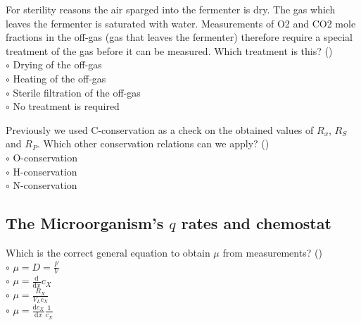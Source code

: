 \documentclass[]{beamer}
\begin{document}
\begin{frame}[shrink] {}
\addtocounter{questions}{1}
\color{blue} For sterility reasons the air sparged into the fermenter is dry. The gas which leaves the fermenter is saturated with water. Measurements of O2 and CO2 mole fractions in the off-gas (gas that leaves the fermenter) therefore require a special treatment of the gas before it can be measured. Which treatment is this?  ()\\
\color{black}
\setlength{\parindent}{-0.4cm}
{\color{red}$\circ$}     Drying of the off-gas \\
{\color{red}$\circ$} Heating of the off-gas \\
{\color{red}$\circ$} Sterile filtration of the off-gas\\
{\color{red}$\circ$} No treatment is required  
\end{frame}

\begin{frame}[shrink] {}
\addtocounter{questions}{1}
\color{blue}
Previously we used C-conservation as a check on the obtained values of $R_x$, $R_S$ and $R_P$.  Which other conservation relations can we apply?  ()\\
\color{black}
\setlength{\parindent}{-0.4cm}
{\color{red}$\circ$}     O-conservation \\
{\color{red}$\circ$} H-conservation\\
{\color{red}$\circ$} N-conservation  \\
\end{frame}
\subsection{The Microorganism's $q$ rates and chemostat} 
\setcounter{questions}{0}

\begin{frame}[shrink] {}
\addtocounter{questions}{1}
\color{blue}
 Which is the correct general equation to obtain $\mu$ from measurements? ()\\
\color{black}
\setlength{\parindent}{-0.4cm}
{\color{red}$\circ$} $\mu= D = \frac{F}{V}$ \\ 
{\color{red}$\circ$} $\mu = \frac{\mathrm d}{\mathrm d x}c_X$\\
{\color{red}$\circ$} $\mu = \frac{R_X}{V_{L}c_X}$ \\
{\color{red}$\circ$} $\mu = \frac{\mathrm dc_X}{\mathrm d x} \frac{1}{c_X}$\\
\end{frame}
\end{document}
